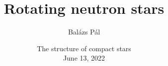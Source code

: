 \title[Rotating neutron stars]
{Rotating neutron stars}


\author[Balázs Pál]
{Balázs Pál}


\date[ELTE 2022]
{The structure of compact stars\\June 13, 2022}

